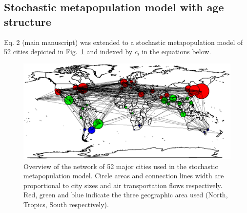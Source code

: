 \clearpage

\subsection{Stochastic metapopulation model with age structure}

Eq. 2 (main manuscript) was extended to a stochastic metapopulation model of 52 cities
depicted in Fig.~\ref{fig:iata} and indexed by $c_l$ in the equations
below.

\begin{figure}[htb]
  \center
  \includegraphics[width= 0.8 \linewidth]{texte/article2/graph_annexe/iata.eps}
  \caption{Overview of the network of 52 major cities used in the
    stochastic metapopulation model. Circle areas and connection lines width are
    proportional to city sizes and air transportation flows respectively. Red,
    green and blue indicate the three geographic area used (North,
    Tropics, South respectively).}
  \label{fig:iata}
\end{figure}


